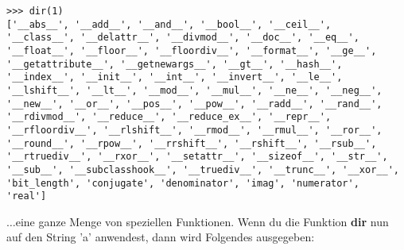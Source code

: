 \begin{Verbatim}[frame=single]
>>> dir(1)
['__abs__', '__add__', '__and__', '__bool__', '__ceil__',
'__class__', '__delattr__', '__divmod__', '__doc__', '__eq__',
'__float__', '__floor__', '__floordiv__', '__format__', '__ge__',
'__getattribute__', '__getnewargs__', '__gt__', '__hash__',
'__index__', '__init__', '__int__', '__invert__', '__le__',
'__lshift__', '__lt__', '__mod__', '__mul__', '__ne__', '__neg__',
'__new__', '__or__', '__pos__', '__pow__', '__radd__', '__rand__',
'__rdivmod__', '__reduce__', '__reduce_ex__', '__repr__',
'__rfloordiv__', '__rlshift__', '__rmod__', '__rmul__', '__ror__',
'__round__', '__rpow__', '__rrshift__', '__rshift__', '__rsub__',
'__rtruediv__', '__rxor__', '__setattr__', '__sizeof__', '__str__',
'__sub__', '__subclasshook__', '__truediv__', '__trunc__', '__xor__',
'bit_length', 'conjugate', 'denominator', 'imag', 'numerator',
'real']
\end{Verbatim}

$\ldots$eine ganze Menge von speziellen Funktionen. Wenn du die Funktion \textbf{dir} nun auf den String 'a' anwendest, dann wird Folgendes ausgegeben:

